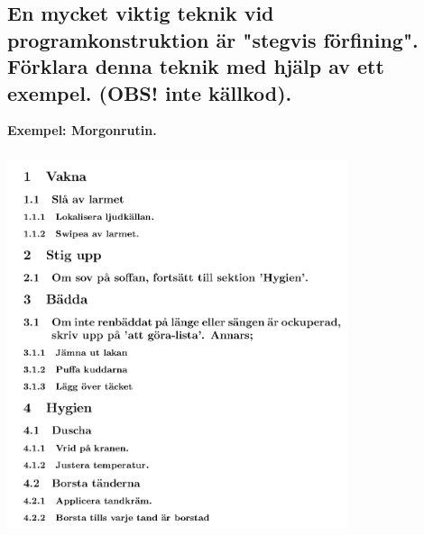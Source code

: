 \documentclass[../main.tex]{subfiles}
\begin{document}
\subsection{En mycket viktig teknik vid programkonstruktion är "stegvis förfining".
Förklara denna teknik med hjälp av ett exempel. (OBS! inte källkod).}

\textbf{Exempel: Morgonrutin.}
\\
\includegraphics[width=10cm, height=12cm]{sec1/Figs/stegvis.png}

\newpage
\end{document}

